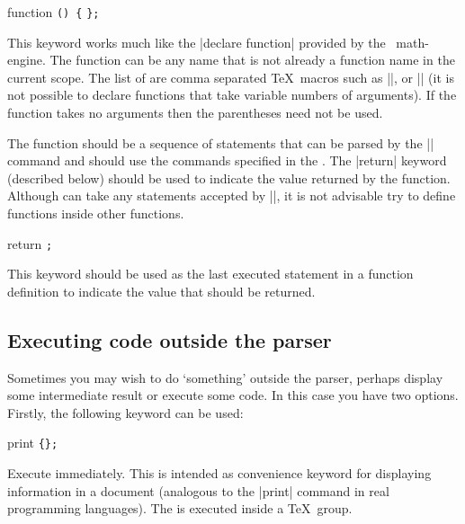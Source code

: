 \begin{math-keyword}{{function} \texttt{(}\texttt{) \{}  \texttt{\};}}

	This keyword works much like the |declare function| provided by the
	\pgfname\ math-engine.
	The function  can be any name that is not already a
	function name in the current scope. The list of  are 
	comma separated \TeX\ macros such as |\x|, or |\y| (it is not
	possible to declare functions that take variable numbers of arguments). 
	If the function
	takes no arguments then the parentheses need not be used.
	
	The function  should be a sequence of statements
	that can be parsed by the |\tikzmath| command and 
	should use the commands specified in the .	
	The |return| keyword (described below) should be used to indicate
	the value returned by the function.
	Although  can take any statements accepted by
	|\tikzmath|, it is not advisable try to define functions inside other 
	functions.
	
\begin{codeexample}[]
\end{codeexample}
	
\end{math-keyword}

\begin{math-keyword}{{return} \texttt{;}}
	
	This keyword should be used as the last executed statement 
	in a function definition to indicate the value that should be 
	returned.
	
\end{math-keyword}


\subsection{Executing code outside the parser}
	
	Sometimes you may wish to do `something' outside the parser,
	perhaps display some intermediate result or execute some code.
	In this case
	you have two options. Firstly, the following keyword can be used:
		
\begin{math-keyword}{{print} \texttt{\{}\texttt{\};}}
	
	Execute  immediately. This is intended as convenience 
	keyword for displaying information in a document (analogous to
	the |print| command in real programming languages).
	The  is executed inside a \TeX\ group.
	
\begin{codeexample}[]
\end{codeexample}

\end{math-keyword}
	

